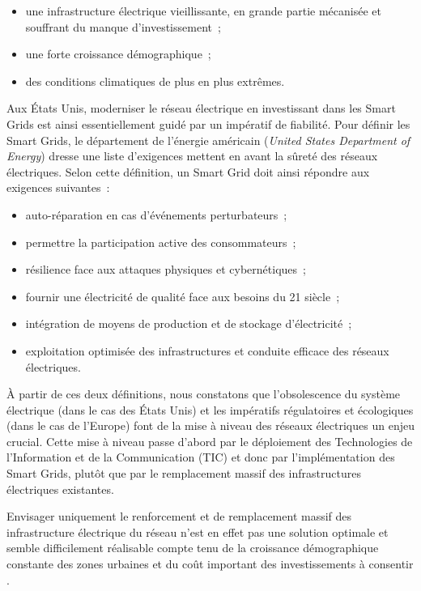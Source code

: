 \begin{itemize}
    \item une infrastructure électrique vieillissante, en grande partie
    mécanisée et souffrant du manque d'investissement~;
    \item une forte croissance démographique~;
    \item des conditions climatiques de plus en plus extrêmes.
\end{itemize}

Aux États Unis, moderniser le réseau électrique en investissant dans les Smart Grids est ainsi essentiellement guidé par un impératif de fiabilité. Pour définir les Smart Grids, le département de l'énergie américain (\textit{United States Department of Energy}) dresse une liste d'exigences mettent en avant la sûreté des réseaux électriques\cite{USDE}. Selon cette définition, un Smart Grid doit ainsi répondre aux exigences suivantes~:

\begin{itemize}
\item auto-réparation en cas d'événements perturbateurs~;
\item permettre la participation active des consommateurs~; 
\item résilience face aux attaques physiques et cybernétiques~;
\item fournir une électricité de qualité face aux besoins du 21 siècle~;
\item intégration de moyens de production et de stockage d'électricité~;
\item exploitation optimisée des infrastructures et conduite efficace des 
réseaux électriques.
\end{itemize} 

À partir de ces deux définitions, nous constatons que l'obsolescence du système électrique (dans le cas des États Unis) et les impératifs régulatoires et écologiques (dans le cas de l'Europe) font de la mise à niveau des réseaux électriques un enjeu crucial. Cette mise à niveau passe d'abord par le déploiement des Technologies de l'Information et de la Communication (TIC) et donc par l'implémentation des Smart Grids, plutôt que par le remplacement massif des infrastructures électriques existantes.

Envisager uniquement le renforcement et de remplacement massif des infrastructure électrique du  réseau 
n'est en effet pas une solution optimale et semble difficilement réalisable compte tenu de la croissance démographique constante des zones urbaines et du coût important des investissements à consentir \cite{cre}.

